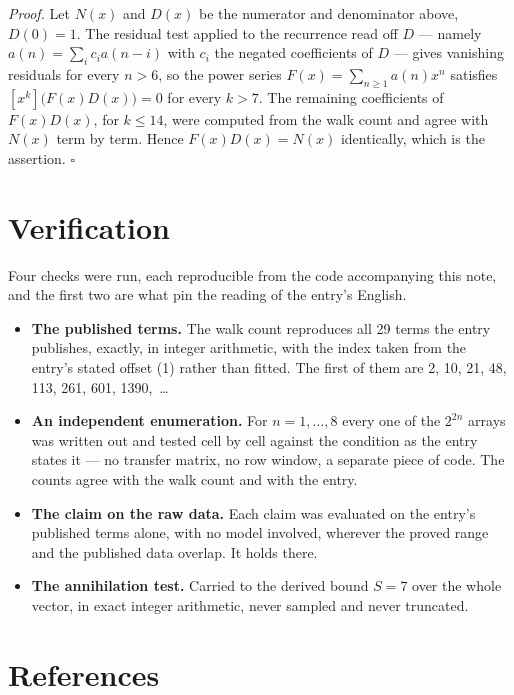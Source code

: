 \documentclass[11pt]{article}
\theoremstyle{definition}
\begin{document}
{\itshape Proof.} Let $N(x)$ and $D(x)$ be the numerator and denominator above, $D(0)=1$. The residual test applied to the recurrence read off $D$ --- namely $a(n) = \sum_i c_i a(n-i)$ with $c_i$ the negated coefficients of $D$ --- gives vanishing residuals for every $n > 6$, so the power series $F(x)=\sum_{n\ge 1}a(n)x^n$ satisfies $[x^k]\bigl(F(x)D(x)\bigr) = 0$ for every $k > 7$. The remaining coefficients of $F(x)D(x)$, for $k \le 14$, were computed from the walk count and agree with $N(x)$ term by term. Hence $F(x)D(x) = N(x)$ identically, which is the assertion. $\square$

\section{Verification}

Four checks were run, each reproducible from the code accompanying this note, and the first two are what pin the reading of the entry's English.

\begin{itemize}

\item {\bfseries The published terms.} The walk count reproduces all 29 terms the entry publishes, exactly, in integer arithmetic, with the index taken from the entry's stated offset (1) rather than fitted. The first of them are 2, 10, 21, 48, 113, 261, 601, 1390,~\dots

\item {\bfseries An independent enumeration.} For $n = 1,\dots,8$ every one of the $2^{2n}$ arrays was written out and tested cell by cell against the condition as the entry states it --- no transfer matrix, no row window, a separate piece of code. The counts agree with the walk count and with the entry.

\item {\bfseries The claim on the raw data.} Each claim was evaluated on the entry's published terms alone, with no model involved, wherever the proved range and the published data overlap. It holds there.

\item {\bfseries The annihilation test.} Carried to the derived bound $S = 7$ over the whole vector, in exact integer arithmetic, never sampled and never truncated.

\end{itemize}

\section{References}
\end{document}
